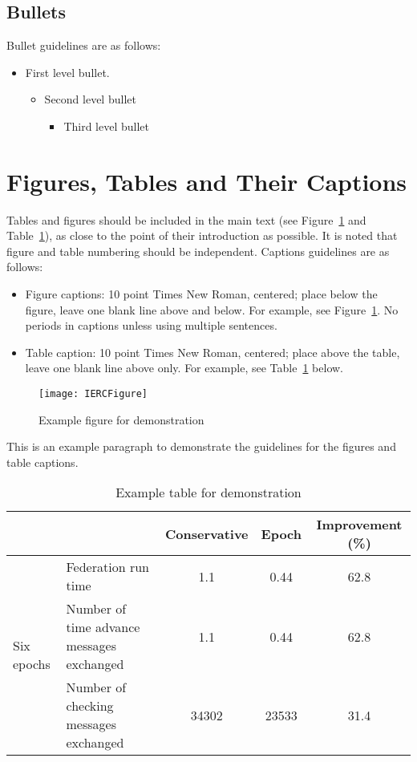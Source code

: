 \documentclass{iserc}%
\begin{document}
\subsection{Bullets}
Bullet guidelines are as follows:
\begin{itemize}
\item First level bullet.
\begin{itemize}
\item Second level bullet
\begin{itemize}
\item Third level bullet
\end{itemize}
\end{itemize}
\end{itemize}

\section{Figures, Tables and Their Captions}
Tables and figures should be included in the main text (see Figure~\ref{fig1} and Table~\ref{tab1}), as close to the point of their introduction as possible.  It is noted that figure and table numbering should be independent.  Captions guidelines are as follows:

\begin{itemize}
\item Figure captions: 10 point Times New Roman, centered; place below the figure, leave one blank line above and below.  For example, see Figure~\ref{fig1}. No periods in captions unless using multiple sentences.
\item Table caption: 10 point Times New Roman, centered; place above the table, leave one blank line above only.  For example, see Table~\ref{tab1} below. 
\end{itemize}

\begin{figure}[htb]
\centering
\texttt{[image: IERCFigure]}
\caption{Example figure for demonstration}\label{fig1}
\end{figure}

This is an example paragraph to demonstrate the guidelines for the figures and table captions. 

\begin{table}[htb]
\caption{Example table for demonstration}\label{tab1}
\vspace{-0.7cm}%
\begin{center}
\begin{tabular}{ll|ccc}
\hline
\multicolumn{2}{l}{}  & Conservative & Epoch & Improvement (\%)\\ \hline
\multirow{3}{*}{Six epochs} & Federation run time & 1.1 & 0.44 & 62.8\\ \cline{2-5}
 & Number of time advance messages exchanged & 1.1 & 0.44 & 62.8\\ \cline{2-5}
 & Number of checking messages exchanged & 34302 & 23533 & 31.4\\ \cline{2-5}

\end{tabular}
\end{center}
\end{table}
\end{document}
